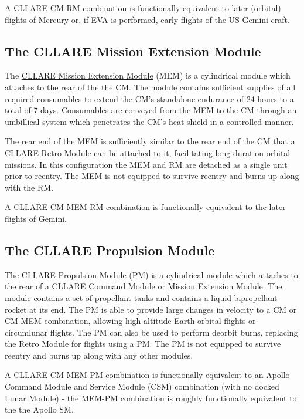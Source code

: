 \documentclass{report}
\begin{document}
A CLLARE CM-RM combination is functionally equivalent to later (orbital) flights of Mercury or, if EVA is performed, early flights of the US Gemini craft.

\subsection{The CLLARE Mission Extension Module}

The \href{http://cstart.org/wiki/CLLARE_Mission_Extension_Module}{CLLARE Mission Extension Module} (MEM) is a cylindrical module which attaches to the rear of the the CM.  The module contains sufficient supplies of all required consumables to extend the CM's standalone endurance of 24 hours to a total of 7 days.  Consumables are conveyed from the MEM to the CM through an umbillical system which penetrates the CM's heat shield in a controlled manner.

The rear end of the MEM is sufficiently similar to the rear end of the CM that a CLLARE Retro Module can be attached to it, facilitating long-duration orbital missions.  In this configuration the MEM and RM are detached as a single unit prior to reentry.  The MEM is not equipped to survive reentry and burns up along with the RM.

A CLLARE CM-MEM-RM combination is functionally equivalent to the later flights of Gemini.

\subsection{The CLLARE Propulsion Module}

The \href{http://cstart.org/wiki/CLLARE_Propulsion_Module}{CLLARE Propulsion Module} (PM) is a cylindrical module which attaches to the rear of a CLLARE Command Module or Mission Extension Module.  The module contains a set of propellant tanks and contains a liquid bipropellant rocket at its end.  The PM is able to provide large changes in velocity to a CM or CM-MEM combination, allowing high-altitude Earth orbital flights or circumlunar flights.  The PM can also be used to perform deorbit burns, replacing the Retro Module for flights using a PM.  The PM is not equipped to survive reentry and burns up along with any other modules.

A CLLARE CM-MEM-PM combination is functionally equivalent to an Apollo Command Module and Service Module (CSM) combination (with no docked Lunar Module) - the MEM-PM combination is roughly functionally equivalent to the the Apollo SM.
\end{document}
